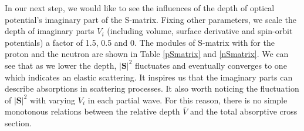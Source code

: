 \documentclass[12pt]{article}
\begin{document}
	In our next step, we would like to see the influences of the depth of optical potential's imaginary part of the S-matrix. Fixing other parameters, we scale the depth of imaginary parts $V_i$ (including volume, surface derivative and spin-orbit potentials) a factor of 1.5, 0.5 and 0. The modules of S-matrix with for the proton and the neutron are shown in Table \ref{pSmatrix} and \ref{nSmatrix}. We can see that as we lower the depth, $|\mathbf{S}|^2$ fluctuates and eventually converges to one which indicates an elastic scattering. It inspires us that the imaginary parts can describe absorptions in scattering processes. It also worth noticing the fluctuation of $|\mathbf{S}|^2$ with varying $V_i$ in each partial wave. For this reason, there is no simple monotonous relations between the relative depth $\bar{V}$ and the total absorptive cross section.
\end{document}
